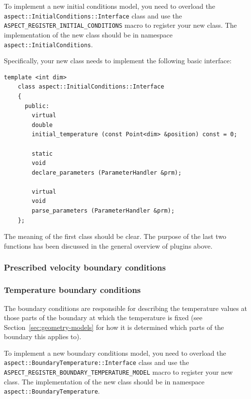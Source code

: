 \documentclass{article}
\begin{document}
To implement a new initial conditions model, you
need to overload the \texttt{aspect::InitialConditions::Interface} class and use
the \texttt{ASPECT\_REGISTER\_INITIAL\_CONDITIONS} macro to register your new
class. The implementation of the new class should be in namespace
\texttt{aspect::InitialConditions}.

Specifically, your new class needs to implement the following basic interface:
\begin{lstlisting}[frame=single]
    template <int dim>
    class aspect::InitialConditions::Interface
    {
      public:
        virtual
        double
        initial_temperature (const Point<dim> &position) const = 0;

        static
        void
        declare_parameters (ParameterHandler &prm);

        virtual
        void
        parse_parameters (ParameterHandler &prm);
    };
\end{lstlisting}
The meaning of the first class should be clear. The purpose
of the last two functions has been discussed in the general overview of
plugins above.


\subsubsection{Prescribed velocity boundary conditions}
\label{sec:prescribed-velocity-boundary-conditions}



\subsubsection{Temperature boundary conditions}
\label{sec:temperature-boundary-conditions}

The boundary conditions are responsible for describing the temperature values
at those parts of the boundary at which the temperature is fixed (see
Section~\ref{sec:geometry-models} for how it is determined which parts of the
boundary this applies to).

To implement a new boundary conditions model, you
need to overload the \texttt{aspect::BoundaryTemperature::Interface} class and use
the \texttt{ASPECT\_REGISTER\_BOUNDARY\_TEMPERATURE\_MODEL} macro to register your new
class. The implementation of the new class should be in namespace
\texttt{aspect::BoundaryTemperature}.
\end{document}
